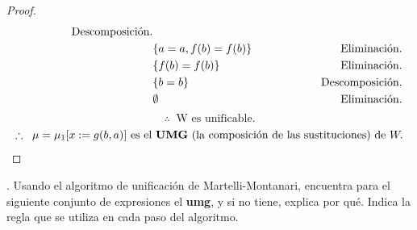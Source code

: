 \documentclass{article}
\begin{document}
\begin{itemize}
\begin{proof}
\begin{eqnarray*}
      \hspace*{1.71cm} \text{Descomposición.}\\
      & \{a = a, f(b) = f(b)\} &
      \hspace*{2.1cm} \text{Eliminación.}\\
      & \{f(b) = f(b)\} &
      \hspace*{2.1cm} \text{Eliminación.}\\
      & \{b = b\} &
      \hspace*{1.8cm} \text{Descomposición.}\\
      & \emptyset &
      \hspace*{2.1cm} \text{Eliminación.}
    \end{eqnarray*}
    \[\therefore\;\; \text{W es unificable.}\]
    \[\therefore\;\; \mu = \mu_{1}[x := g(b,a)] \text{ es el \textbf{UMG} (la composición de las sustituciones) de } W.\]
  \end{proof}
\end{itemize}
. Usando el algoritmo de unificación de Martelli-Montanari, encuentra para el siguiente
conjunto de expresiones el \textbf{umg}, y si no tiene, explica por qué. Indica la regla que se
utiliza en cada paso del algoritmo.
\end{document}
